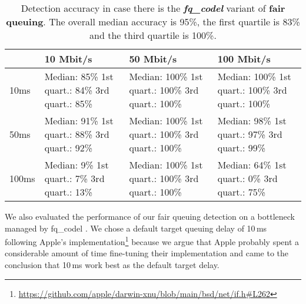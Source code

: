 \documentclass[conference]{IEEEtran}
\begin{document}
\begin{table}
\begin{tabularx}{\columnwidth}{| l | X | X | X |}
\hline
& 10 Mbit/s & 50 Mbit/s & 100 Mbit/s \\ \hline
10ms & Median: 85\% \newline 1st quart.: 84\% \newline 3rd quart.: 85\% & Median: 100\% \newline 1st quart.: 100\% \newline 3rd quart.: 100\% & Median: 100\% \newline 1st quart.: 100\% \newline 3rd quart.: 100\%\\ \hline
50ms & Median: 91\% \newline 1st quart.: 88\% \newline 3rd quart.: 92\% & Median: 100\% \newline 1st quart.: 100\% \newline 3rd quart.: 100\% & Median: 98\% \newline 1st quart.: 97\% \newline 3rd quart.: 99\% \\ \hline
100ms & Median: 9\% \newline 1st quart.: 7\% \newline 3rd quart.: 13\% & Median: 100\% \newline 1st quart.: 100\% \newline 3rd quart.: 100\% & Median: 64\% \newline 1st quart.: 0\% \newline 3rd quart.: 75\% \\ \hline
\end{tabularx}
\caption{Detection accuracy in case there is the \textbf{\textit{fq\_codel}} variant of \textbf{fair queuing}. The overall median accuracy is 95\%, the first quartile is 83\% and the third quartile is 100\%.}
\label{table:fq_codel}
\end{table}        

We also evaluated the performance of our fair queuing detection on a bottleneck managed by fq\_codel \cite{hoeiland-joergensen_flow_2018}. 
We chose a default target queuing delay of 10\,ms following Apple's implementation\footnote{
    \url{https://github.com/apple/darwin-xnu/blob/main/bsd/net/if.h\#L262}
} because we argue that Apple probably spent a considerable amount of time fine-tuning their implementation and 
came to the conclusion that 10\,ms work best as the default target delay. 
\end{document}
